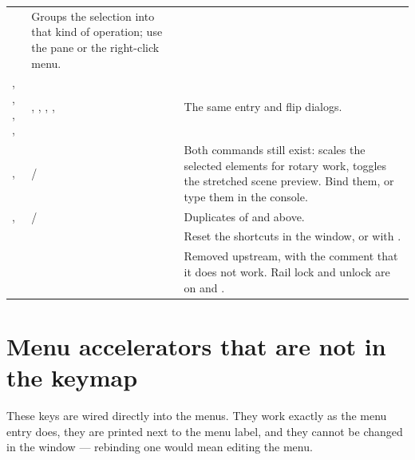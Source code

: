 \begin{center}
\begin{tabular}{@{}L{4.4cm}L{4.8cm}L{5.6cm}@{}}
& Groups the selection into that kind of operation; use the 
pane or the right-click menu. \\
, , , ,  & ,
, , , 
& The same entry and flip dialogs. \\
\midrule
{},  &  /  & Both
commands still exist:  scales the selected elements for rotary
work,  toggles the stretched scene preview. Bind them, or type
them in the console. \\
,  &  /
 & Duplicates of  and 
above. \\
 &  & Reset the shortcuts in
the  window, or with . \\
 &  & Removed upstream, with the
comment that it does not work. Rail lock and unlock are on  and
. \\
\bottomrule
\end{tabular}
\end{center}

\section{Menu accelerators that are not in the keymap}
\label{sec:shortcuts-menu}

These keys are wired directly into the menus. They work exactly as the menu
entry does, they are printed next to the menu label, and they cannot be changed
in the  window --- rebinding one would mean editing the menu.

